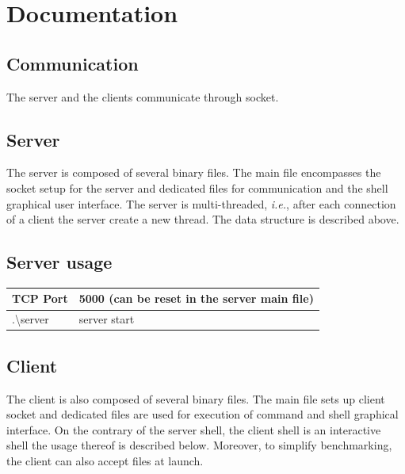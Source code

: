 \documentclass[a4paper,11pt]{report}
\begin{document}
    \printbibliography

    \newpage

    \section*{Documentation}

    \subsection*{Communication}
    The server and the clients communicate through socket.

    \subsection*{Server}
    The server is composed of several binary files.
    The main file encompasses the socket setup for the server and dedicated files for communication and the shell
    graphical user interface.
    The server is multi-threaded, \textit{i.e.}, after each connection of a client the server create a new thread.
    The data structure is described above.


    \subsection*{Server usage}

    \begin{centering}
        \begin{tabular}{|m{3cm}|m{7cm}|}
            \hline
            TCP Port & 5000 (can be reset in the server main file) \\
            \hline
            .\textbackslash server & server start \\
            \hline
        \end{tabular}
    \end{centering}

    \subsection*{Client}
    The client is also composed of several binary files.
    The main file sets up client socket and dedicated files are used for execution of command and shell graphical
    interface.
    On the contrary of the server shell, the client shell is an interactive shell the usage thereof is described below.
    Moreover, to simplify benchmarking, the client can also accept files at launch.
\end{document}
